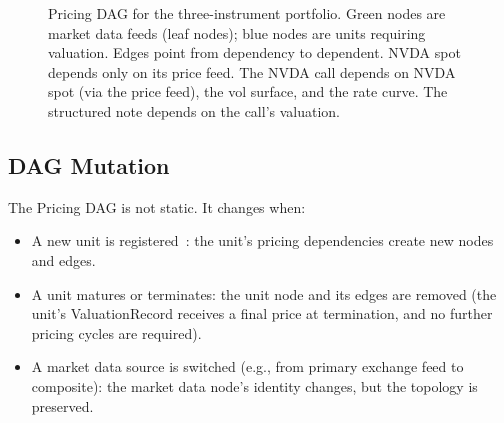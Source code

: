 \documentclass[11pt,a4paper]{article}
\begin{document}
\begin{figure}[ht]
\centering
{}
\caption{Pricing DAG for the three-instrument portfolio.  Green nodes are market data feeds (leaf nodes); blue nodes are units requiring valuation.  Edges point from dependency to dependent.  NVDA spot depends only on its price feed.  The NVDA call depends on NVDA spot (via the price feed), the vol surface, and the rate curve.  The structured note depends on the call's valuation.}
\label{fig:pricing-dag}
\end{figure}

\subsection{DAG Mutation}

The Pricing DAG is not static.  It changes when:

\begin{itemize}[nosep]
\item A new unit is registered~\cite[\S3.4]{ledger}: the unit's pricing dependencies create new nodes and edges.
\item A unit matures or terminates: the unit node and its edges are removed (the unit's ValuationRecord receives a final price at termination, and no further pricing cycles are required).
\item A market data source is switched (e.g., from primary exchange feed to composite): the market data node's identity changes, but the topology is preserved.
\end{itemize}
\end{document}
